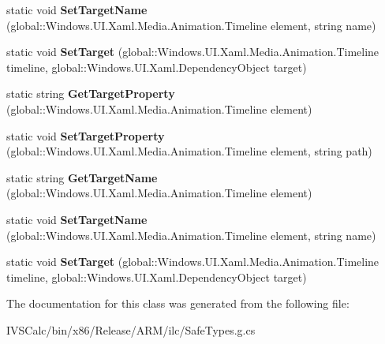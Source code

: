 \begin{DoxyCompactItemize}
static void {\bfseries Set\+Target\+Name} (global\+::\+Windows.\+U\+I.\+Xaml.\+Media.\+Animation.\+Timeline element, string name)
\item 
\mbox{\label{class_windows_1_1_u_i_1_1_xaml_1_1_media_1_1_animation_1_1_storyboard_a9a120900e03e5275519d4f240ae6671b}} 
static void {\bfseries Set\+Target} (global\+::\+Windows.\+U\+I.\+Xaml.\+Media.\+Animation.\+Timeline timeline, global\+::\+Windows.\+U\+I.\+Xaml.\+Dependency\+Object target)
\item 
\mbox{\label{class_windows_1_1_u_i_1_1_xaml_1_1_media_1_1_animation_1_1_storyboard_a992ba47ffd0cf9810bb90b1fefa1b861}} 
static string {\bfseries Get\+Target\+Property} (global\+::\+Windows.\+U\+I.\+Xaml.\+Media.\+Animation.\+Timeline element)
\item 
\mbox{\label{class_windows_1_1_u_i_1_1_xaml_1_1_media_1_1_animation_1_1_storyboard_ab3c2752dde5914726dbdb8671f80b4bf}} 
static void {\bfseries Set\+Target\+Property} (global\+::\+Windows.\+U\+I.\+Xaml.\+Media.\+Animation.\+Timeline element, string path)
\item 
\mbox{\label{class_windows_1_1_u_i_1_1_xaml_1_1_media_1_1_animation_1_1_storyboard_a4ad4c5f27f472132b6e4ec18554505e0}} 
static string {\bfseries Get\+Target\+Name} (global\+::\+Windows.\+U\+I.\+Xaml.\+Media.\+Animation.\+Timeline element)
\item 
\mbox{\label{class_windows_1_1_u_i_1_1_xaml_1_1_media_1_1_animation_1_1_storyboard_a50a435394c414f84722c631eb3ce3840}} 
static void {\bfseries Set\+Target\+Name} (global\+::\+Windows.\+U\+I.\+Xaml.\+Media.\+Animation.\+Timeline element, string name)
\item 
\mbox{\label{class_windows_1_1_u_i_1_1_xaml_1_1_media_1_1_animation_1_1_storyboard_a9a120900e03e5275519d4f240ae6671b}} 
static void {\bfseries Set\+Target} (global\+::\+Windows.\+U\+I.\+Xaml.\+Media.\+Animation.\+Timeline timeline, global\+::\+Windows.\+U\+I.\+Xaml.\+Dependency\+Object target)
\end{DoxyCompactItemize}


The documentation for this class was generated from the following file\+:\begin{DoxyCompactItemize}
\item 
I\+V\+S\+Calc/bin/x86/\+Release/\+A\+R\+M/ilc/Safe\+Types.\+g.\+cs\end{DoxyCompactItemize}
